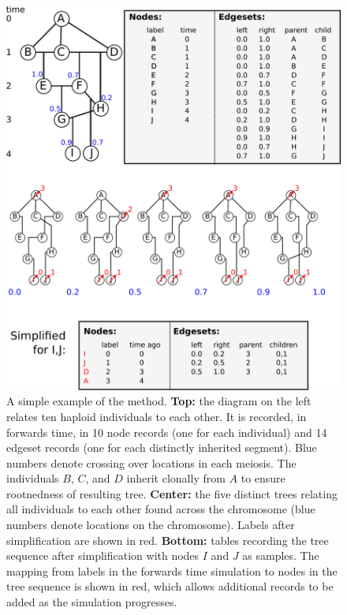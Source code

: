 \documentclass{article}
\begin{document}
\begin{figure}
    \begin{center}
        \includegraphics{method_diagram}
    \end{center}
    \caption{
        A simple example of the method.
        \textbf{Top:} the diagram on the left relates ten haploid individuals to each other.
        It is recorded, in forwards time,
        in 10 node records (one for each individual)
        and 14 edgeset records (one for each distinctly inherited segment).
        Blue numbers denote crossing over locations in each meiosis.
        The individuals $B$, $C$, and $D$ inherit clonally from $A$
        to ensure rootnedness of resulting tree.
        \textbf{Center:} the five distinct trees relating all individuals to each other
        found across the chromosome (blue numbers denote locations on the chromosome).
        Labels after simplification are shown in red.
        \textbf{Bottom:} tables recording the tree sequence after simplification
        with nodes $I$ and $J$ as samples.
        The mapping from labels in the forwards time simulation to nodes in the tree sequence
        is shown in red,
        which allows additional records to be added as the simulation progresses.
        \label{fig:method_diagram}
    }
\end{figure}
\end{document}
